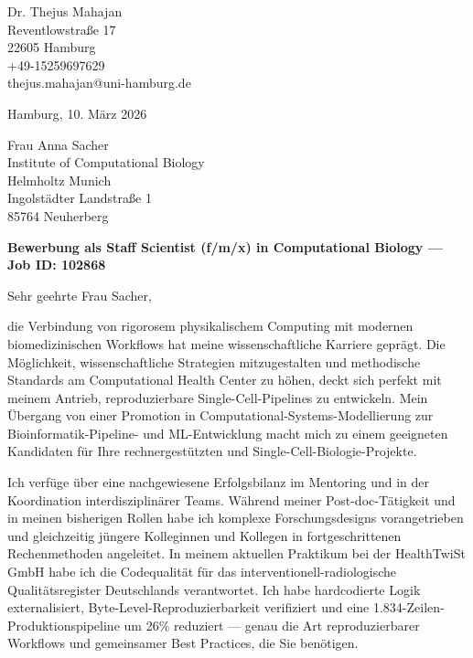 \documentclass[9pt, a4paper]{extarticle}
\begin{document}
\pagestyle{empty}

\begin{flushleft}
Dr. Thejus Mahajan\\
Reventlowstra{\ss}e 17\\
22605 Hamburg\\
+49-15259697629\\
thejus.mahajan@uni-hamburg.de
\end{flushleft}

\vspace{0.3cm}

\begin{flushright}
Hamburg, 10. M\"arz 2026
\end{flushright}

\vspace{0.3cm}

\begin{flushleft}
Frau Anna Sacher\\
Institute of Computational Biology\\
Helmholtz Munich\\
Ingolst\"adter Landstra{\ss}e 1\\
85764 Neuherberg
\end{flushleft}

\vspace{0.3cm}

\textbf{Bewerbung als Staff Scientist (f/m/x) in Computational Biology --- Job ID: 102868}

\vspace{0.2cm}

Sehr geehrte Frau Sacher,

die Verbindung von rigorosem physikalischem Computing mit modernen biomedizinischen Workflows hat meine wissenschaftliche Karriere gepr\"agt. Die M\"oglichkeit, wissenschaftliche Strategien mitzugestalten und methodische Standards am Computational Health Center zu h\"ohen, deckt sich perfekt mit meinem Antrieb, reproduzierbare Single-Cell-Pipelines zu entwickeln. Mein \"Ubergang von einer Promotion in Computational-Systems-Modellierung zur Bioinformatik-Pipeline- und ML-Entwicklung macht mich zu einem geeigneten Kandidaten f\"ur Ihre rechnergest\"utzten und Single-Cell-Biologie-Projekte.

Ich verf\"uge \"uber eine nachgewiesene Erfolgsbilanz im Mentoring und in der Koordination interdisziplin\"arer Teams. W\"ahrend meiner Post-doc-T\"atigkeit und in meinen bisherigen Rollen habe ich komplexe Forschungsdesigns vorangetrieben und gleichzeitig j\"ungere Kolleginnen und Kollegen in fortgeschrittenen Rechenmethoden angeleitet. In meinem aktuellen Praktikum bei der HealthTwiSt GmbH habe ich die Codequalit\"at f\"ur das interventionell-radiologische Qualit\"atsregister Deutschlands verantwortet. Ich habe hardcodierte Logik externalisiert, Byte-Level-Reproduzierbarkeit verifiziert und eine 1.834-Zeilen-Produktionspipeline um 26\% reduziert --- genau die Art reproduzierbarer Workflows und gemeinsamer Best Practices, die Sie ben\"otigen.
\end{document}
